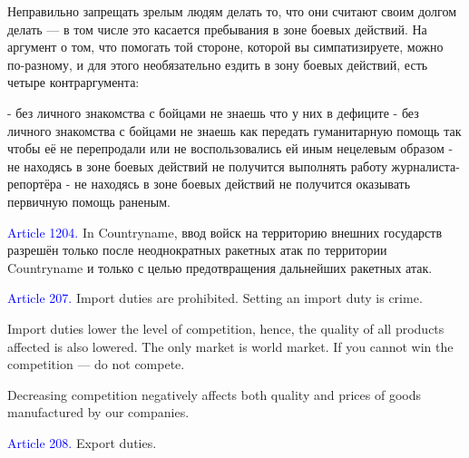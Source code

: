 \documentclass[11pt]{article}
\theoremstyle{remark}
\theoremstyle{definition}
\begin{document}
\color{blue}



Неправильно запрещать зрелым людям делать то, что они считают своим долгом делать --- в том числе это касается пребывания в зоне боевых действий. На аргумент о том, что помогать той стороне, которой вы симпатизируете, можно по-разному, и для этого необязательно ездить в зону боевых действий, есть четыре контраргумента:

- без личного знакомства с бойцами не знаешь что у них в дефиците
- без личного знакомства с бойцами не знаешь как передать гуманитарную помощь так чтобы её не перепродали или не воспользовались ей иным нецелевым образом
- не находясь в зоне боевых действий не получится выполнять работу журналиста-репортёра
- не находясь в зоне боевых действий не получится оказывать первичную помощь раненым.






\color{black}



\textcolor{blue}{Article 1204.} In Countryname, ввод войск на территорию внешних государств разрешён только после неоднократных ракетных атак по территории Countryname и только с целью предотвращения дальнейших ракетных атак.

















\textcolor{blue}{Article 207.} Import duties are prohibited. Setting an import duty is crime.

\color{blue}

Import duties lower the level of competition, hence, the quality of all products affected is also lowered. The only market is world market. If you cannot win the competition --- do not compete.

Decreasing competition negatively affects both quality and prices of goods manufactured by our companies.

\color{black}


\textcolor{blue}{Article 208.} Export duties.
\end{document}
